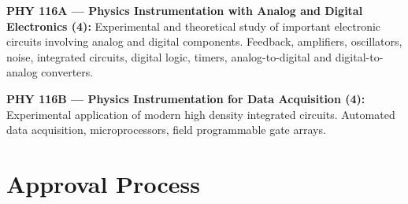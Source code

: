 \documentclass[12pt]{article}
\begin{document}
\vskip 1cm
\noindent
{\bf PHY 116A --- Physics Instrumentation with Analog and Digital Electronics (4):}  
Experimental and theoretical study of important electronic circuits
involving analog and digital components.  Feedback, amplifiers,
oscillators, noise, integrated circuits, digital logic, timers,
analog-to-digital and digital-to-analog converters.

\vskip 1cm
\noindent 
{\bf PHY 116B --- Physics Instrumentation for Data Acquisition (4):}  
Experimental application of modern high density integrated circuits.
Automated data acquisition,  microprocessors, field programmable gate arrays.

\newpage

\section{Approval Process}
\label{sec:approval}
\end{document}
